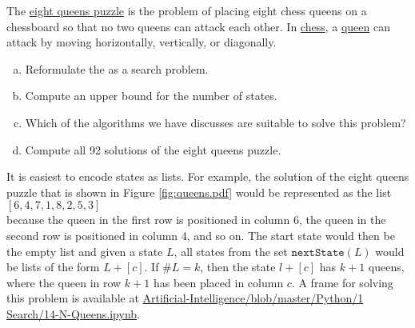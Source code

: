 

\exercise
The \href{https://en.wikipedia.org/wiki/Eight_queens_puzzle}{eight queens puzzle} is the problem of  placing
eight chess queens on a chessboard so that no two queens can attack each other.  In
\href{https://en.wikipedia.org/wiki/Chess}{chess}, a \href{https://en.wikipedia.org/wiki/Queen_(chess)}{queen}
can attack by moving horizontally, vertically, or diagonally.  
\begin{enumerate}[(a)]
\item Reformulate the  as a search problem.
\item Compute an upper bound for the number of states.
\item Which of the algorithms we have discusses are suitable to solve this problem?
\item Compute all 92 solutions of the eight queens puzzle.  
\end{enumerate}

\hint
It is easiest to encode states as lists.  For example, the solution of the eight queens puzzle that is shown in
Figure \ref{fig:queens.pdf} would be represented as the list 
\\[0.2cm]
\hspace*{1.3cm}
$[6, 4, 7, 1, 8, 2, 5, 3]$
\\[0.2cm]
because the queen in the first row is positioned in column 6, the queen in the second row is positioned in
column 4, and so on.  The start state would then be the empty list and given a state $L$, all states from the
set $\mathtt{nextState}(L)$ would be lists of the form $L + [c]$.  If $\#L = k$, then the state $l + [c]$ has
$k+1$ queens, where the queen in row $k+1$ has been placed in column $c$.
A frame for solving this problem is available at
\href{https://github.com/karlstroetmann/Artificial-Intelligence/blob/master/Python/1
  Search/14-N-Queens.ipynb}{Artificial-Intelligence/blob/master/Python/1 Search/14-N-Queens.ipynb}.


